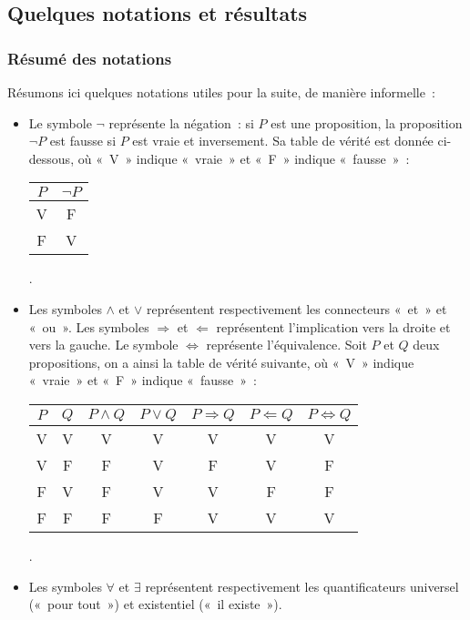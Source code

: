 \subsection{Quelques notations et résultats}

\subsubsection{Résumé des notations}

Résumons ici quelques notations utiles pour la suite, de manière informelle :

\begin{itemize}
\item Le symbole $\neg$ représente la négation : si $P$ est une proposition, la proposition $\neg P$ est fausse si $P$ est vraie et inversement. 
Sa table de vérité est donnée ci-dessous, où « V » indique « vraie » et « F » indique « fausse » : 
\begin{center}
\begin{tabular}{c | c}
    $P$ & $\neg P$ \\
    \hline
    V & F \\
    F & V
\end{tabular} .
\end{center}
\item Les symboles $\wedge$ et $\vee$ représentent respectivement les connecteurs « et » et « ou ». 
Les symboles $\Rightarrow$ et $\Leftarrow$ représentent l'implication vers la droite et vers la gauche. 
Le symbole $\Leftrightarrow$ représente l'équivalence. 
Soit $P$ et $Q$ deux propositions, on a ainsi la table de vérité suivante, où « V » indique « vraie » et « F » indique « fausse » : 
\begin{center}
\begin{tabular}{c c | c c c c c}
    $P$ & $Q$ & $P \wedge Q$ & $P \vee Q$ & $P \Rightarrow Q$ & $P \Leftarrow Q$ & $P \Leftrightarrow Q$ \\
    \hline
    V & V & V & V & V & V & V \\
    V & F & F & V & F & V & F \\
    F & V & F & V & V & F & F \\
    F & F & F & F & V & V & V \\
\end{tabular} .
\end{center}
\item Les symboles $\forall$ et $\exists$ représentent respectivement les quantificateurs universel (« pour tout ») et existentiel (« il existe »). 

\end{itemize}
